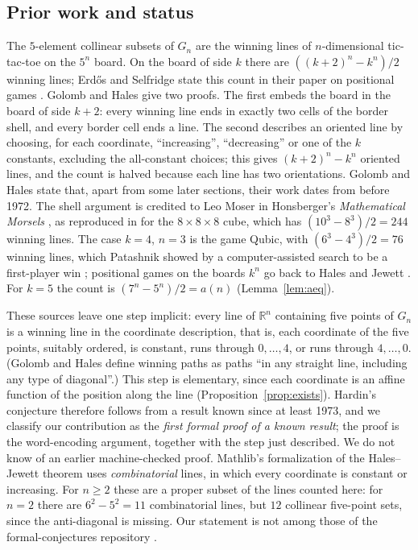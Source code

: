 \documentclass[11pt]{amsart}
\theoremstyle{plain}
\theoremstyle{definition}
\newcommand{\R}{\mathbb{R}}
\begin{document}
\subsection*{Prior work and status}
The $5$-element collinear subsets of $G_n$ are the winning lines of $n$-dimensional tic-tac-toe on the $5^n$ board. On the board of side $k$ there are $((k+2)^n-k^n)/2$ winning lines; Erd\H{o}s and Selfridge state this count in their paper on positional games \cite{ES}.
Golomb and Hales \cite[Theorem~1]{GH} give two proofs.
The first embeds the board in the board of side $k+2$: every winning line ends in exactly two cells of the border shell, and every border cell ends a line.
The second describes an oriented line by choosing, for each coordinate, ``increasing'', ``decreasing'' or one of the $k$ constants, excluding the all-constant choices; this gives $(k+2)^n-k^n$ oriented lines, and the count is halved because each line has two orientations.
Golomb and Hales state that, apart from some later sections, their work dates from before 1972.
The shell argument is credited to Leo Moser in Honsberger's \emph{Mathematical Morsels} \cite{Ho}, as reproduced in \cite{CTK} for the $8\times8\times8$ cube, which has $(10^3-8^3)/2=244$ winning lines.
The case $k=4$, $n=3$ is the game Qubic, with $(6^3-4^3)/2=76$ winning lines, which Patashnik showed by a computer-assisted search to be a first-player win \cite{Pa}; positional games on the boards $k^n$ go back to Hales and Jewett \cite{HJ}.
For $k=5$ the count is $(7^n-5^n)/2=a(n)$ (Lemma~\ref{lem:aeq}).

These sources leave one step implicit: every line of $\R^n$ containing five points of $G_n$ is a winning line in the coordinate description, that is, each coordinate of the five points, suitably ordered, is constant, runs through $0,\dots,4$, or runs through $4,\dots,0$. (Golomb and Hales define winning paths as paths ``in any straight line, including any type of diagonal''.)
This step is elementary, since each coordinate is an affine function of the position along the line (Proposition~\ref{prop:exists}).
Hardin's conjecture therefore follows from a result known since at least 1973, and we classify our contribution as the \emph{first formal proof of a known result}; the proof is the word-encoding argument, together with the step just described.
We do not know of an earlier machine-checked proof. Mathlib's formalization of the Hales--Jewett theorem \cite{Mathlib} uses \emph{combinatorial} lines, in which every coordinate is constant or increasing. For $n\ge2$ these are a proper subset of the lines counted here: for $n=2$ there are $6^2-5^2=11$ combinatorial lines, but $12$ collinear five-point sets, since the anti-diagonal is missing.
Our statement is not among those of the formal-conjectures repository \cite{FC}.
\end{document}

